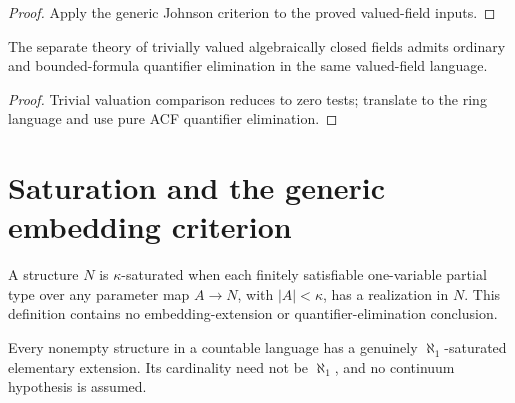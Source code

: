 \begin{proof}


\leanok

Apply the generic Johnson criterion to the proved valued-field inputs.

\end{proof}

\begin{theorem}

\label{ordinary-trivial}


\leanok

The separate theory of trivially valued algebraically closed fields admits
ordinary and bounded-formula quantifier elimination in the same valued-field
language.

\end{theorem}

\begin{proof}


\leanok

Trivial valuation comparison reduces to zero tests; translate to the
ring language and use pure ACF quantifier elimination.

\end{proof}

\section{Saturation and the generic embedding criterion}

\begin{definition}

\label{saturation}


\leanok

A structure $N$ is $\kappa$-saturated when each finitely satisfiable
one-variable partial type over any parameter map $A\to N$, with $|A|<\kappa$,
has a realization in $N$. This definition contains no embedding-extension
or quantifier-elimination conclusion.

\end{definition}

\begin{theorem}

\label{ultrapower}


\leanok

Every nonempty structure in a countable language has a genuinely
$\aleph_1$-saturated elementary extension. Its cardinality need not be
$\aleph_1$, and no continuum hypothesis is assumed.

\end{theorem}

